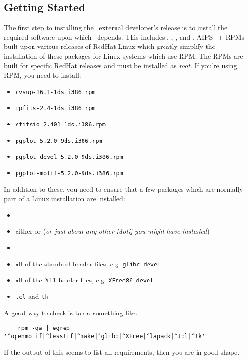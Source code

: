 \subsection{Getting Started}
\label{developer release setting up}

The first step to installing the \aipspp\ external developer's release is to
install the required software upon which \aipspp\ depends. This includes
,
,
, and
. AIPS++
RPMs built upon various releases of RedHat Linux which greatly simplify the installation
of these packages for Linux systems which use RPM. The RPMs are built for specific
RedHat releases and must be installed as {\em root}. If you're using RPM, you need to
install:
\begin{itemize}
\item \verb+cvsup-16.1-1ds.i386.rpm+
\item \verb+rpfits-2.4-1ds.i386.rpm+
\item \verb+cfitsio-2.401-1ds.i386.rpm+
\item \verb+pgplot-5.2.0-9ds.i386.rpm+
\item \verb+pgplot-devel-5.2.0-9ds.i386.rpm+
\item \verb+pgplot-motif-5.2.0-9ds.i386.rpm+
\end{itemize}
In addition to these, you need to ensure that a few packages which are normally
part of a Linux installation are installed:
\begin{itemize}
\item {}
\item either  or
       ({\em or just about any
      other Motif you might have installed})
\item {}
\item all of the standard header files, e.g. \verb+glibc-devel+
\item all of the X11 header files, e.g. \verb+XFree86-devel+
\item \verb+tcl+ and \verb+tk+
\end{itemize}
A good way to check is to do something like:
\begin{verbatim}
    rpm -qa | egrep '^openmotif|^lesstif|^make|^glibc|^XFree|^lapack|^tcl|^tk'
\end{verbatim}
If the output of this seems to list all requirements, then you are in good shape.

